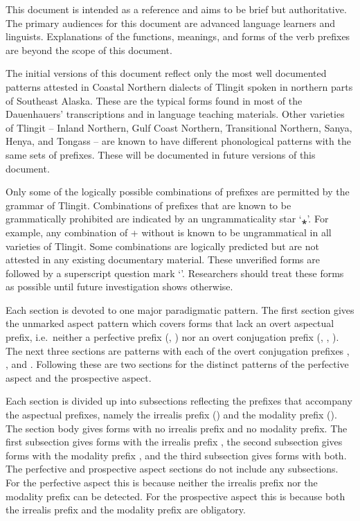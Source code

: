 \documentclass[12pt,letterpaper,landscape,oneside,article]{memoir}
\begin{document}
\begin{multicols}{2}
This document is intended as a reference and aims to be brief but authoritative.
The primary audiences for this document are advanced language learners and linguists.
Explanations of the functions, meanings, and forms of the verb prefixes are beyond the scope of this document.

The initial versions of this document reflect only the most well documented patterns attested in Coastal Northern dialects of Tlingit spoken in northern parts of Southeast Alaska.
These are the typical forms found in most of the Dauenhauers’ transcriptions and in language teaching materials.
Other varieties of Tlingit – Inland Northern, Gulf Coast Northern, Transitional Northern, Sanya, Henya, and Tongass – are known to have different phonological patterns with the same sets of prefixes.
These will be documented in future versions of this document.

Only some of the logically possible combinations of prefixes are permitted by the grammar of Tlingit.
Combinations of prefixes that are known to be grammatically prohibited are indicated by an ungrammaticality star ‘⁎’.
For example, any combination of  +  without  is known to be ungrammatical in all varieties of Tlingit.
Some combinations are logically predicted but are not attested in any existing documentary material.
These unverified forms are followed by a superscript question mark ‘\supques{}’.
Researchers should treat these forms as possible until future investigation shows otherwise.

Each section is devoted to one major paradigmatic pattern.
The first section gives the unmarked aspect pattern which covers forms that lack an overt aspectual prefix, i.e.\ neither a perfective prefix (, ) nor an overt conjugation prefix (, , ).
The next three sections are patterns with each of the overt conjugation prefixes , , and .
Following these are two sections for the distinct patterns of the perfective aspect and the prospective aspect.

Each section is divided up into subsections reflecting the prefixes that accompany the aspectual prefixes, namely the irrealis prefix () and the modality prefix ().
The section body gives forms with no irrealis prefix and no modality prefix.
The first subsection gives forms with the irrealis prefix , the second subsection gives forms with the modality prefix , and the third subsection gives forms with both.
The perfective and prospective aspect sections do not include any subsections.
For the perfective aspect this is because neither the irrealis prefix nor the modality prefix can be detected.
For the prospective aspect this is because both the irrealis prefix  and the modality prefix  are obligatory.


\end{multicols}
\end{document}

